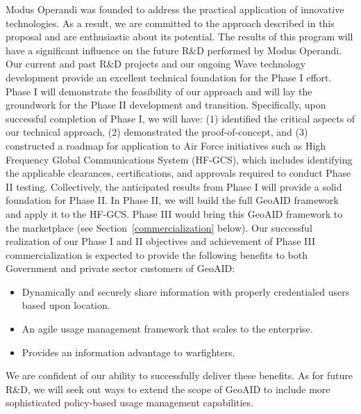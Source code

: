 \documentclass{sbir}
\begin{document}
Modus Operandi was founded to address the practical application of innovative technologies. As a result, we are committed to the approach described in this proposal and are enthusiastic about its potential. The results of this program will have a significant influence on the future R\&D performed by Modus Operandi. Our current and past R\&D projects and our ongoing Wave technology development provide an excellent technical foundation for the Phase I effort. Phase I will demonstrate the feasibility of our approach and will lay the groundwork for the Phase II development and transition. Specifically, upon successful completion of Phase I, we will have: (1) identified the critical aspects of our technical approach, (2) demonstrated the proof-of-concept, and (3) constructed a roadmap for application to Air Force initiatives such as High Frequency Global Communications System (HF-GCS), which includes identifying the applicable clearances, certifications, and approvals required to conduct Phase II testing. Collectively, the anticipated results from Phase I will provide a solid foundation for Phase II. In Phase II, we will build the full GeoAID framework and apply it to the HF-GCS. Phase III would bring this GeoAID framework to the marketplace (see Section~\ref{commercialization} below).
Our successful realization of our Phase I and II objectives and achievement of Phase III commercialization is expected to provide the following benefits to both Government and private sector customers of GeoAID:
\vspace{-0.1in}
\begin{itemize}
     \item Dynamically and securely share information with properly credentialed users based upon location.
     \item An agile usage management framework that scales to the enterprise.
     \item Provides an information advantage to warfighters.
\end{itemize}
We are confident of our ability to successfully deliver these benefits. As for future R\&D, we will seek out ways to extend the scope of GeoAID to include more sophisticated policy-based usage management capabilities.

\label{commercialization}
\end{document}
